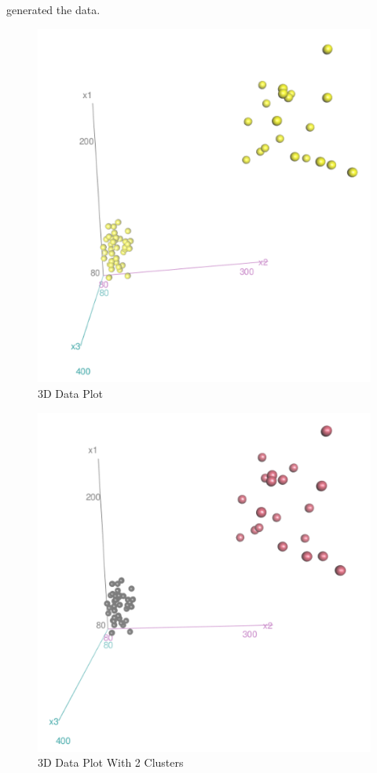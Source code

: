 \documentclass[12pt]{article}
\makeatletter
\theoremstyle{homework}
\newenvironment{exercise}[1]
{\def\@currentlabel{#1}\exercisecore}
{\endexercisecore}
\makeatother
\begin{document}
\begin{exercise}{1}
\begin{enumerate}
      generated the data. 
        \begin{figure}[H]
          \begin{center}
            \caption{3D Data Plot}
          \includegraphics[width = .80\textwidth]{Dat3d.png}
          \end{center}
        \end{figure}
        \begin{figure}[H]
          \begin{center}
            \caption{3D Data Plot With 2 Clusters}
          \includegraphics[width = .80\textwidth]{Dat3DClustered.png}
          \end{center}
        \end{figure}
        \vspace{.15in}




\end{enumerate}
\end{exercise}
\end{document}

